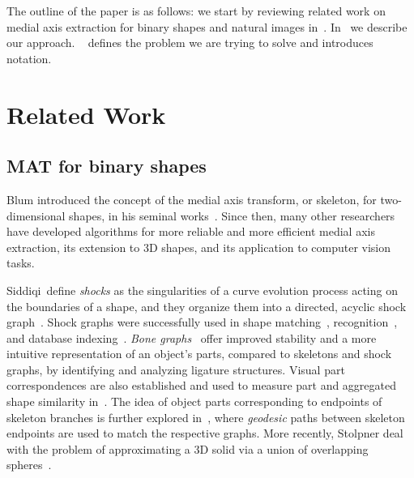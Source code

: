 \documentclass[10pt,twocolumn,letterpaper]{article}
\begin{document}
The outline of the paper is as follows: we start by reviewing related work on medial axis extraction for binary shapes
and natural images in~.
In~ we describe our approach.
~ defines the problem we are trying to solve and introduces notation.



\section{Related Work}\label{sec:related}
\subsection{MAT for binary shapes}\label{sec:related:binary}
Blum introduced the concept of the medial axis transform, or skeleton, for two-dimensional shapes,
in  his seminal works~\cite{blum1967transformation,blum1973biological}.
Since then, many other researchers have developed algorithms for more reliable
and more efficient medial axis extraction, its extension to 3D shapes, and its application
to computer vision tasks.

Siddiqi~\etal define \emph{shocks} as the singularities of a curve evolution process acting on the boundaries of
a shape, and they organize them into a directed, acyclic shock graph~\cite{siddiqi1999shock}.
Shock graphs were successfully used in shape matching~\cite{siddiqi1999shock}, recognition~\cite{sebastian2001recognition},
and database indexing~\cite{sebastian2002shock}.
\emph{Bone graphs}~\cite{macrini2008skeletons} offer improved stability and a more intuitive representation of an object's parts, 
compared to skeletons and shock graphs, by identifying and analyzing ligature structures.
Visual part correspondences are also established and used to measure part and aggregated shape similarity in~\cite{latecki2000shape}.
The idea of object parts corresponding to endpoints of skeleton branches is further explored in~\cite{bai2008path}, where
\emph{geodesic} paths between skeleton endpoints are used to match the respective graphs.
More recently, Stolpner \etal deal with the problem of approximating a 3D solid via a union
of overlapping spheres~\cite{stolpner2012medial}.
\end{document}
